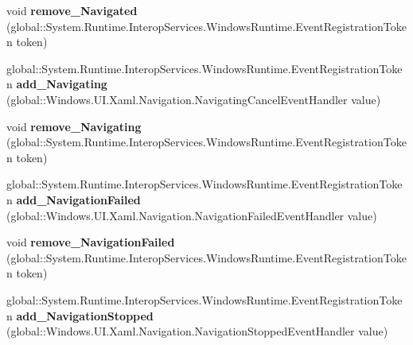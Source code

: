\begin{DoxyCompactItemize}
\item 
\mbox{\label{interface_windows_1_1_u_i_1_1_xaml_1_1_controls_1_1_i_frame_ae1e509398fa988a1ac20830119b65746}} 
void {\bfseries remove\+\_\+\+Navigated} (global\+::\+System.\+Runtime.\+Interop\+Services.\+Windows\+Runtime.\+Event\+Registration\+Token token)
\item 
\mbox{\label{interface_windows_1_1_u_i_1_1_xaml_1_1_controls_1_1_i_frame_a0fec4101c1beb2f3dca164279586bed6}} 
global\+::\+System.\+Runtime.\+Interop\+Services.\+Windows\+Runtime.\+Event\+Registration\+Token {\bfseries add\+\_\+\+Navigating} (global\+::\+Windows.\+U\+I.\+Xaml.\+Navigation.\+Navigating\+Cancel\+Event\+Handler value)
\item 
\mbox{\label{interface_windows_1_1_u_i_1_1_xaml_1_1_controls_1_1_i_frame_a02c229c53c3cb4701d53b253bce7a3e1}} 
void {\bfseries remove\+\_\+\+Navigating} (global\+::\+System.\+Runtime.\+Interop\+Services.\+Windows\+Runtime.\+Event\+Registration\+Token token)
\item 
\mbox{\label{interface_windows_1_1_u_i_1_1_xaml_1_1_controls_1_1_i_frame_a468020f0bcda5132e8e4e7a3cd190fc7}} 
global\+::\+System.\+Runtime.\+Interop\+Services.\+Windows\+Runtime.\+Event\+Registration\+Token {\bfseries add\+\_\+\+Navigation\+Failed} (global\+::\+Windows.\+U\+I.\+Xaml.\+Navigation.\+Navigation\+Failed\+Event\+Handler value)
\item 
\mbox{\label{interface_windows_1_1_u_i_1_1_xaml_1_1_controls_1_1_i_frame_a808dc5cb45c82eb7e649575c9f7b74ca}} 
void {\bfseries remove\+\_\+\+Navigation\+Failed} (global\+::\+System.\+Runtime.\+Interop\+Services.\+Windows\+Runtime.\+Event\+Registration\+Token token)
\item 
\mbox{\label{interface_windows_1_1_u_i_1_1_xaml_1_1_controls_1_1_i_frame_ad7cfc7f7bc803572ff9c2acc44ad2cb8}} 
global\+::\+System.\+Runtime.\+Interop\+Services.\+Windows\+Runtime.\+Event\+Registration\+Token {\bfseries add\+\_\+\+Navigation\+Stopped} (global\+::\+Windows.\+U\+I.\+Xaml.\+Navigation.\+Navigation\+Stopped\+Event\+Handler value)

\end{DoxyCompactItemize}
